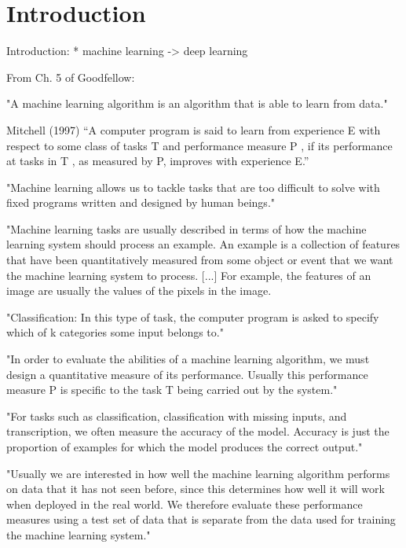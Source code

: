 \chapter{Introduction}


Introduction:
* machine learning -> deep learning

From Ch. 5 of Goodfellow:

"A machine learning algorithm is an algorithm that is able to learn from data."

Mitchell (1997) “A computer program is said to learn from experience E with respect to some class of tasks T and performance measure P , if its performance at tasks in T , as measured by P, improves with experience E.” 

"Machine learning allows us to tackle tasks that are too difficult to solve with fixed programs written and designed by human beings."

"Machine learning tasks are usually described in terms of how the machine learning system should process an example. An example is a collection of features that have been quantitatively measured from some object or event that we want the machine learning system to process. [...]  For example, the features of an image are usually the values of the pixels in the image.

"Classification: In this type of task, the computer program is asked to specify which of k categories some input belongs to."

"In order to evaluate the abilities of a machine learning algorithm, we must design a quantitative measure of its performance. Usually this performance measure P is specific to the task T being carried out by the system."

"For tasks such as classification, classification with missing inputs, and transcription, we often measure the accuracy of the model. Accuracy is just the proportion of examples for which the model produces the correct output."

"Usually we are interested in how well the machine learning algorithm performs on data that it has not seen before, since this determines how well it will work when deployed in the real world. We therefore evaluate these performance measures using a test set of data that is separate from the data used for training the machine learning system."

